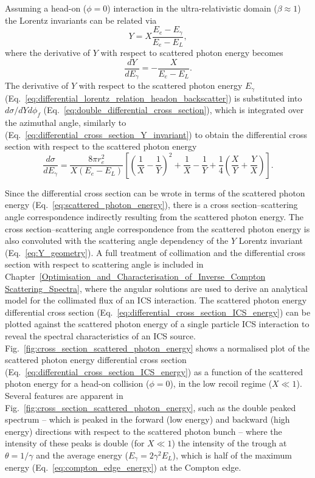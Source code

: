 \documentclass[../main.tex]{subfiles}
\begin{document}
Assuming a head-on ($\phi=0$) interaction in the ultra-relativistic domain ($\beta\approx1$) the Lorentz invariants can be related via
\begin{equation}
Y = X\frac{E_{e}-E_{\gamma}}{E_{e}-E_{L}},
\label{eq:lorentz_relation_headon_backscatter}
\end{equation}
where the derivative of $Y$ with respect to scattered photon energy becomes
\begin{equation}
\frac{dY}{dE_{\gamma}} = -\frac{X}{E_{e}-E_{L}}.
\label{eq:differential_lorentz_relation_headon_backscatter}
\end{equation}
The derivative of $Y$ with respect to the scattered photon energy $E_{\gamma}$ (Eq.~\ref{eq:differential_lorentz_relation_headon_backscatter}) is substituted into $d\sigma/dYd\phi_{f}$ (Eq.~\ref{eq:double_differential_cross_section}), which is integrated over the azimuthal angle, similarly to (Eq.~\ref{eq:differential_cross_section_Y_invariant}) to obtain the differential cross section with respect to the scattered photon energy
\begin{equation}
\frac{d\sigma}{dE_{\gamma}} = \frac{8\pi r_{e}^{2}}{X\left(E_{e}-E_{L}\right)}\left[\left(\frac{1}{X}-\frac{1}{Y}\right)^{2}+\frac{1}{X}-\frac{1}{Y}+\frac{1}{4}\left(\frac{X}{Y}+\frac{Y}{X}\right)\right].
\label{eq:differential_cross_section_ICS_energy}    
\end{equation}

Since the differential cross section can be wrote in terms of the scattered photon energy (Eq.~\ref{eq:scattered_photon_energy}), there is a cross section--scattering angle correspondence indirectly resulting from the scattered photon energy. The cross section--scattering angle correspondence from the scattered photon energy is also convoluted with the scattering angle dependency of the $Y$ Lorentz invariant (Eq.~\ref{eq:Y_geometry}). A full treatment of collimation and the differential cross section with respect to scattering angle is included in Chapter~\ref{Optimisation_and_Characterisation_of_Inverse_Compton Scattering_Spectra}, where the angular solutions are used to derive an analytical model for the collimated flux of an ICS interaction.    
The scattered photon energy differential cross section (Eq.~\ref{eq:differential_cross_section_ICS_energy}) can be plotted against the scattered photon energy of a single particle ICS interaction to reveal the spectral characteristics of an ICS source. Fig.~\ref{fig:cross_section_scattered_photon_energy} shows a normalised plot of the scattered photon energy differential cross section (Eq.~\ref{eq:differential_cross_section_ICS_energy}) as a function of the scattered photon energy for a head-on collision ($\phi=0$), in the low recoil regime ($X \ll 1$). Several features are apparent in Fig.~\ref{fig:cross_section_scattered_photon_energy}, such as the double peaked spectrum -- which is peaked in the forward (low energy) and backward (high energy) directions with respect to the scattered photon bunch -- where the intensity of these peaks is double (for $X \ll 1$) the intensity of the trough at $\theta=1/\gamma$ and the average energy ($E_{\gamma} = 2\gamma^{2}E_{L}$), which is half of the maximum energy (Eq.~\ref{eq:compton_edge_energy}) at the Compton edge.   
\end{document}
